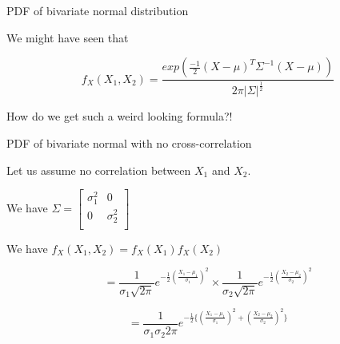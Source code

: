 \documentclass{beamer}
\begin{document}
\begin{frame}{PDF of bivariate normal distribution}

We might have seen that 

$$f_X(X_1, X_2) = \frac{exp(\frac{-1}{2}(X-\mu)^T \Sigma^{-1}(X-\mu))}{2\pi |\Sigma|^\frac{1}{2}}$$

How do we get such a weird looking formula?!

\end{frame}

\begin{frame}{PDF of bivariate normal with no cross-correlation}

Let us assume no correlation between $X_1$ and $X_2$.

We have $\Sigma = \begin{bmatrix}
\sigma_1^2 & 0 \\
0 & \sigma_2^2 \\
\end{bmatrix}$

We have $f_X(X_1, X_2) = f_X(X_1)f_X(X_2)$

$$=\frac{1}{\sigma_1 \sqrt{2\pi} } e^{-\frac{1}{2}\left(\frac{X_1-\mu_1}{\sigma_1}\right)^2} \times \frac{1}{\sigma_2 \sqrt{2\pi} } e^{-\frac{1}{2}\left(\frac{X_2-\mu_2}{\sigma_2}\right)^2}$$

$$= \frac{1}{\sigma_1 \sigma_2 2\pi } e^{-\frac{1}{2}\{\left(\frac{X_1-\mu_1}{\sigma_1}\right)^2 + \left(\frac{X_2-\mu_2}{\sigma_2}\right)^2 \}}  $$



\end{frame}
\end{document}
